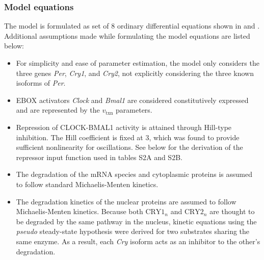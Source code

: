 \subsubsection{Model equations}
The model is formulated as set of 8 ordinary differential equations shown in  and . 
Additional assumptions made while formulating the model equations are listed below:

\begin{itemize}

  \item For simplicity and  ease of parameter estimation, the model only considers the three genes {\it Per}, {\it Cry1}, and {\it Cry2}, not explicitly considering the three known isoforms of {\it Per}. 

  \item EBOX activators {\it Clock} and {\it Bmal1} are considered constitutively expressed and are represented by the $v_{\text{txn}}$ parameters. 

  \item Repression of CLOCK-BMAL1 activity is attained through Hill-type inhibition. The Hill coefficient is fixed at 3, which was found to provide sufficient nonlinearity for oscillations. See below for the derivation of the repressor input function used in tables S2A and S2B.

  \item The degradation of the mRNA species and cytoplasmic proteins is assumed to follow standard Michaelis-Menten kinetics.

  \item The degradation kinetics of the nuclear proteins are assumed to follow Michaelis-Menten kinetics. Because both $\text{CRY1}_n$ and $\text{CRY2}_n$ are thought to be degraded by the same pathway in the nucleus, kinetic equations using the {\it pseudo} steady-state hypothesis were derived for two substrates sharing the same enzyme. As a result, each {\it Cry} isoform acts as an inhibitor to the other's degradation.
\end{itemize}

